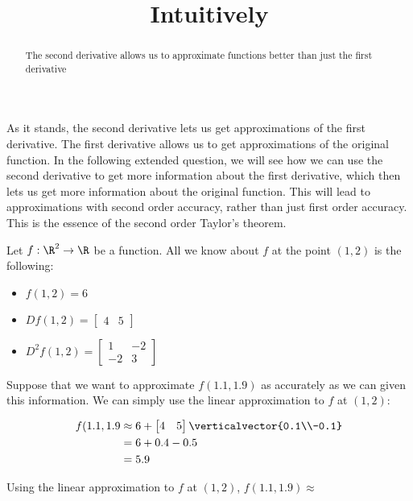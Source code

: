 \documentclass{ximera}
\title{Intuitively}
\begin{document}
	\begin{abstract}
		The second derivative allows us to approximate functions better than just the first derivative
	\end{abstract}
	
	As it stands, the second derivative lets us get approximations of the first derivative.  The first derivative allows us to get approximations of the original function.
	In the following extended question, we will see how we can use the second derivative to get more information about the first derivative, which then lets us get more
	information about the original function.  This will lead to approximations with second order accuracy, rather than just first order accuracy.  This is the essence of 
	the second order Taylor's theorem.
	
	\begin{question}
	Let $f:\R^2 \to \R$ be a function.  All we know about $f$ at the point $(1,2)$ is the following:
		\begin{itemize}
			\item $f(1,2) = 6$
			\item \(Df(1,2) = \begin{bmatrix} 4 & 5 \end{bmatrix}\)
			\item \( D^2f(1,2)  = \begin{bmatrix} 1 & -2 \\ -2 & 3\end{bmatrix}\)
		\end{itemize} 
		
		Suppose that we want to approximate $f(1.1,1.9)$ as accurately as we can given this information.
		We can simply use the linear approximation to $f$ at $(1,2)$:
		
		\begin{solution}
			\begin{hint}
				\begin{align*}
					f(1.1,1.9 &\approx 6+\begin{bmatrix} 4 & 5 \end{bmatrix} \verticalvector{0.1\\-0.1}\\
							&=6+0.4-0.5\\
							&=5.9
				\end{align*}
			\end{hint}
			Using the linear approximation to $f$ at $(1,2)$, $f(1.1,1.9) \approx$ 
		\end{solution}
		

\end{question}
\end{document}

